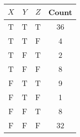 \documentclass[a4paper]{article}
\theoremstyle{definition}
\begin{document}
\begin{table}[H]
        \centering
                \begin{tabular}{cccc}
                           $X$ & $Y$ & $Z$ & Count \\
                                \hline
                                T & T & T & 36 \\
                                \hline
                                T & T & F & 4 \\
                                \hline
                                T & F & T & 2 \\
                                \hline
                                T & F & F & 8 \\
                                \hline
                                F & T & T & 9 \\
                                \hline
                                F & T & F & 1 \\
                                \hline
                                F & F & T & 8 \\
                                \hline
                                F & F & F & 32 \\
                                \hline
                \end{tabular}
\end{table}
\end{document}
